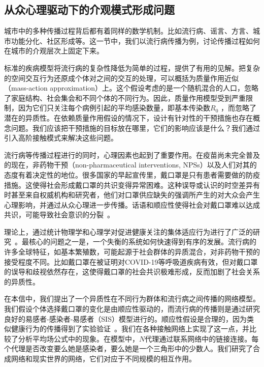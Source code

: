\subsection{从众心理驱动下的介观模式形成问题}

城市中的多种传播过程背后都有着同样的数学机制\cite{gao2019effects, ribeiro2020city}。比如流行病、谣言、方言、城市功能分化、社区形成等。这一节中，我们以流行病传播为例，讨论传播过程如何在城市的介观层次上固定下来。

标准的疾病模型将流行病的复杂性降低为简单的过程，提供了有用的见解。把复杂的空间交互行为还原成个体对之间的交互的处理，可以概括为质量作用近似（mass-action approximation）上\cite{mollison1995epidemic}。这个假设考虑的是一个随机混合的人口，忽略了家庭结构、社会集会和不同个体的不同行为。因此，质量作用模型受到严重限制，因为它们只关注每个病例引起的平均感染数量，即基本传染数$R_0$ ，而忽略了潜在的异质性\cite{hebert2020beyond}。在依赖质量作用假设的情况下，设计有针对性的干预措施也存在概念问题。我们应该把干预措施的目标放在哪里，它们的影响应该是什么？我们通过引入高阶接触模式来解决这些问题。

流行病等传播过程进行的同时，心理因素也起到了重要作用。在疫苗尚未完全普及的现在，非药物干预（non-pharmaceutical interventions, NPSs）以及人们对其的态度有着决定性的地位。很多国家的早起宣传里，戴口罩是只有患者需要做的防疫措施。这使得社会形成戴口罩的共识变得异常困难\cite{lai2020effect, van2020face, Adolph2020PandemicPT, hellewell2020feasibility, Wolf2020AwarenessAA, Cheng2020TheRO, eikenberry2020to, erku2020fear, enberg2020covid}。这种误导或认识的时空差异有时甚至来自权威机构和研究者，他们对口罩供应缺失的强调所产生的对大众会产生心理影响\cite{biancovilli2020governments,landi2020should,sugaya2020real,weill2020social}，并通过从众心理进一步传播。话语和顺应性使得社会对戴口罩难以达成共识，可能导致社会意识的分裂~\cite{holme2006nonequilibrium}。

理论上，通过统计物理学和心理学对促进健康关注的集体适应行为进行了广泛的研究~\cite{castellano2009statistical, centola2007complex, centola2010spread, centola2011experimental, christakis2007spread}。最核心的问题之一是，一个失衡的系统如何快速得到有序的发展。流行病的许多全球特征，如基本繁殖数，可能起源于社会群体的异质混合，对非药物干预的接受程度不同。比如戴口罩在被证明对COVID-19等呼吸道疾病有效，但对戴口罩的误导和歧视依然存在，这使得戴口罩的社会共识极难形成，反而加剧了社会关系的异质性。



在本信中，我们提出了一个异质性在不同行为群体和流行病之间传播的网络模型。我们假设个体选择戴口罩的变化是由顺应性驱动的，而流行病的传播则是通过研究良好的易感者-感染者-易感者（SIS）模型进行的。顺应性假设是合理的，因为类似健康行为的传播得到了实验验证~\cite{christakis2008collective, zhang2016support}。我们在各种接触网络上实现了这一点，并比较了分析平均场公式中的现象。在模型中，$N$代理通过联系网络中的链接连接。每个代理是否改变要么她是感染者，要么她是一个三角形中的少数人。我们研究了合成网络和现实世界的网络，它们对应于不同规模的相互作用。

